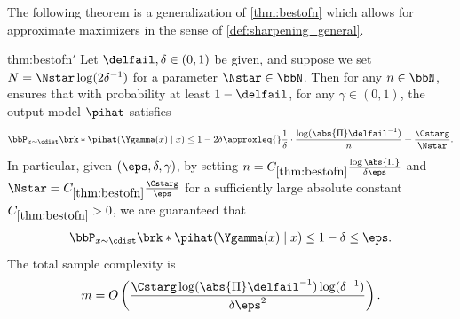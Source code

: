 
The following theorem is a generalization of \cref{thm:bestofn} which allows for approximate maximizers in the sense of \cref{def:sharpening_general}.
  \begin{thmmod}{thm:bestofn}{$'$}
  \label{thm:bestofn_general}
  Let $\delfail,\delta\in(0,1)$ be given, and suppose we set
  $N=\Nstar\log(2\delta^{-1})$ for a parameter $\Nstar\in\bbN$. Then
  for any $n\in\bbN$, \bestofnalg ensures that with probability at least $1-\delfail$, for any $\gamma\in(0,1)$, the output model $\pihat$ satisfies
  \begin{align}
    \bbP_{x\sim\cdist}\brk*{\pihat(\Ygamma(x)\mid{}x)\leq{}1-2\delta}
    \approxleq{} \frac{1}{\delta}\cdot{}\frac{\log(\abs{\Pi}\delfail^{-1})}{n} + \frac{\Cstarg}{\Nstar}.
  \end{align}
In particular, given $(\eps,\delta,\gamma)$, by setting
$n=C_{\ref{thm:bestofn}}\frac{\log\abs{\Pi}}{\delta\eps}$ and
$\Nstar=C_{\ref{thm:bestofn}}\frac{\Cstarg}{\eps}$ for a sufficiently
large absolute constant $C_{\ref{thm:bestofn}}>0$,
we are guaranteed that
\begin{align}
  \bbP_{x\sim\cdist}\brk*{\pihat(\Ygamma(x)\mid{}x)\leq{}1-\delta}
  \leq \eps. \label{eq:top_k_ub}
\end{align}
The total sample complexity is
\begin{align}
  m = O\left(\frac{\Cstarg\log(\abs{\Pi}\delfail^{-1})\log(\delta^{-1})}{\delta\eps^2}\right).
\end{align}
\end{thmmod}


